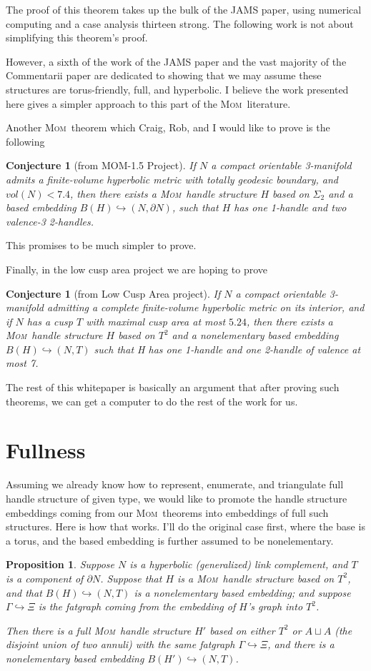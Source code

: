 \documentclass{article}
\theoremstyle{plain}
\newtheorem{conjecture}[theorem]{Conjecture}
\newtheorem{proposition}[theorem]{Proposition}
\theoremstyle{plain}
\theoremstyle{definition}
\numberwithin{equation}{section}
\newcommand{\MOM}{\textsc{Mom}}
\begin{document}
The proof of this theorem takes up the bulk of the JAMS paper,
using numerical computing and a case analysis thirteen strong.
The following work is not about simplifying this theorem's proof.

However, a sixth of the work of the JAMS paper and the vast 
majority of the Commentarii paper are dedicated to showing that
we may assume these structures are torus-friendly, full,
and hyperbolic. I believe the work presented here gives a
simpler approach to this part of the \MOM\ literature.

Another \MOM\ theorem which Craig, Rob, and I would like
to prove is the following
\begin{conjecture}[from MOM-1.5 Project]
If $N$ a compact orientable 3-manifold
admits a finite-volume hyperbolic metric with totally geodesic
boundary, and $vol(N) < 7.4$, then there exists a \MOM\ handle
structure $H$ based on $\Sigma_2$ and a based embedding
$B(H) \hookrightarrow (N,\partial N)$, such that $H$
has one 1-handle and two valence-3 2-handles.
\end{conjecture}

This promises to be much simpler to prove.

Finally, in the low cusp area project we are hoping to prove
\begin{conjecture}[from Low Cusp Area project]
If $N$ a compact orientable 3-manifold admitting a
complete finite-volume hyperbolic metric on its interior,
and if $N$ has a cusp $T$ with maximal cusp area at most
$5.24$, then there exists a \MOM\ handle structure $H$
based on $T^2$ and a nonelementary based embedding $B(H) \hookrightarrow (N,T)$
such that H has one 1-handle and one 2-handle of valence at most 7.
\end{conjecture}

The rest of this whitepaper is basically an argument
that after proving such theorems, we can get a computer
to do the rest of the work for us.

\section{Fullness}
Assuming we already know how to represent, enumerate,
and triangulate full handle structure of given type,
we would like to promote the handle structure embeddings
coming from our \MOM\ theorems into embeddings of
full such structures. Here is how that works. I'll do
the original case first, where the base is a torus,
and the based embedding is further assumed to be nonelementary.

\begin{proposition}
Suppose $N$ is a hyperbolic (generalized) link complement,
and $T$ is a component of $\partial N$. Suppose that $H$
is a \MOM\ handle structure based on $T^2$, and that
$B(H) \hookrightarrow (N, T)$ is a nonelementary based embedding;
and suppose $\Gamma \hookrightarrow \Xi$ is the fatgraph
coming from the embedding of $H$'s graph into $T^2$.

Then there is a full \MOM\ handle structure $H'$ based on
either $T^2$ or $A \sqcup A$ (the disjoint union of two annuli)
with the same fatgraph $\Gamma \hookrightarrow \Xi$, and
there is a nonelementary based embedding $B(H') \hookrightarrow (N, T)$.
\end{proposition}
\end{document}
